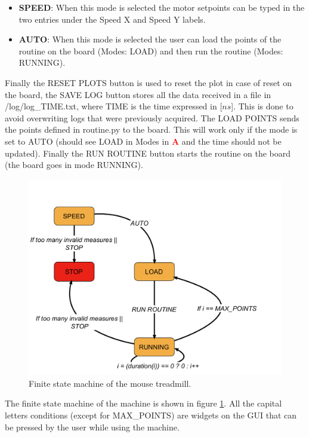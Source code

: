 \documentclass[12pt,a4paper, twoside]{article}
\begin{document}
\begin{itemize}
\begin{itemize}
		\item \textbf{SPEED}: When this mode is selected the motor setpoints can be typed in the two entries under the Speed X and Speed Y labels.
		\item \textbf{AUTO}: When this mode is selected the user can load the points of the routine on the board (Modes: LOAD) and then run the routine (Modes: RUNNING).
	\end{itemize} 
	Finally the RESET PLOTS button is used to reset the plot in case of reset on the board, the SAVE LOG button stores all the data received in a file in /log/log\_TIME.txt, where TIME is the time expressed in [$ns$]. This is done to avoid overwriting logs that were previously acquired. The LOAD POINTS sends the points defined in routine.py to the board. This will work only if the mode is set to AUTO (should see LOAD in Modes in  \textcolor{red}{\textbf{A}} and the time should not be updated). Finally the RUN ROUTINE button starts the routine on the board (the board goes in mode RUNNING).	
\end{itemize}  
\begin{figure}[H]
	\centering
	\includegraphics[width=0.7\linewidth]{fig/FSM.pdf}
	\caption{Finite state machine of the mouse treadmill.}\label{fig:FSM}
\end{figure}
The finite state machine of the machine is shown in figure \ref{fig:FSM}. All the capital letters conditions (except for MAX\_POINTS) are widgets on the GUI that can be pressed by the user while using the machine.
\end{document}

